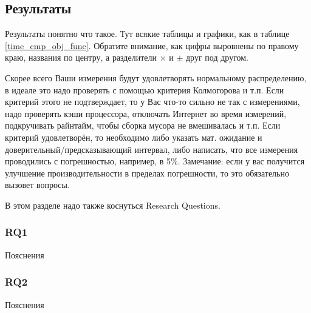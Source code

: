 \subsection{Результаты}
Результаты понятно что такое. Тут всякие таблицы и графики, как в таблице \ref{time_cmp_obj_func}. Обратите внимание, как цифры выровнены по правому краю, названия по центру, а разделители $\times$ и $\pm$ друг под другом. 

Скорее всего Ваши измерения будут удовлетворять нормальному распределению, в идеале это надо проверять с помощью критерия Колмогорова и т.п. Если критерий этого не подтверждает, то у Вас что-то сильно не так с измерениями, надо проверять кэши процессора, отключать Интернет во время измерений, подкручивать райнтайм, чтобы сборка мусора не вмешивалась и т.п. Если критерий удовлетворён, то необходимо либо указать мат. ожидание и доверительный/предсказывающий интервал, либо написать, что все измерения проводились с погрешностью, например, в 5\%. Замечание: если у вас получится улучшение производительности в пределах погрешности, то это обязательно вызовет вопросы.

В этом разделе надо также коснуться Research Questions.

\subsubsection{RQ1} Пояснения
\subsubsection{RQ2} Пояснения


